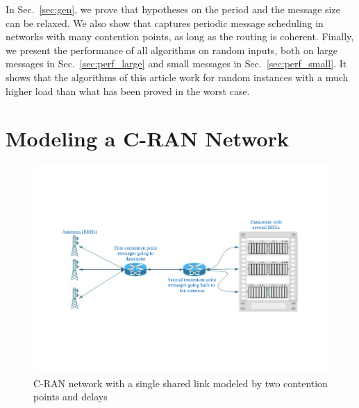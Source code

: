 \documentclass[pdflatex,sn-mathphys,iicol]{sn-jnl}%
\theoremstyle{thmstyleone}%
\theoremstyle{thmstyletwo}%
\theoremstyle{thmstylethree}%
\begin{document}
In Sec.~\ref{sec:gen}, we prove that hypotheses on the period and the message size can be relaxed. We also show that \pma captures periodic message scheduling in networks with many contention points, as long as the routing is coherent.
Finally, we present the performance of all algorithms on random inputs, both on large messages in Sec.~\ref{sec:perf_large} and small messages in Sec.~\ref{sec:perf_small}.
It shows that the algorithms of this article work for random instances with a much higher load than what has been proved in the worst case.


\section{Modeling a C-RAN Network}\label{sec:model}
\begin{center}
\begin{figure}

\centering
\includegraphics[scale=0.3]{network2.pdf} 


\caption{C-RAN network with a single shared link modeled by two contention points and delays}
\label{fig:model}
\end{figure}
\end{center}
\end{document}
